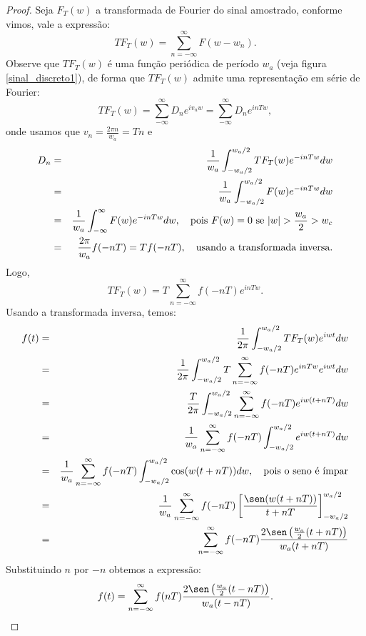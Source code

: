 \begin{proof} Seja $F_T(w)$ a transformada de Fourier do sinal amostrado, conforme vimos, vale a expressão:
\begin{equation}
TF_T(w)=\sum_{n=-\infty}^\infty F(w-w_n).
\end{equation}
Observe que $TF_T(w)$ é uma função periódica de período $w_a$ (veja figura \ref{sinal_discreto1}), de forma que $TF_T(w)$ admite uma representação em série de Fourier:
\begin{equation}
TF_T(w)=\sum_{-\infty}^\infty D_n e^{iv_n w}=\sum_{-\infty}^\infty D_n e^{in Tw},
\end{equation}
onde usamos que $v_n=\frac{2\pi n}{w_a}=Tn$ e 
\begin{eqnarray*}
D_n&=&\frac{1}{w_a}\int_{-w_a/2}^{w_a/2}TF_T(w)e^{-in Tw}dw\\
&=&\frac{1}{w_a}\int_{-w_a/2}^{w_a/2}F(w)e^{-in Tw}dw\\
&=&\frac{1}{w_a}\int_{-\infty}^{\infty}F(w)e^{-in T w}dw,\quad \hbox{pois}\ F(w)=0\ \hbox{se}\ |w|>\frac{w_a}{2}>w_c\\
&=&\frac{2\pi}{w_a}f(-nT)=Tf(-nT),\quad \hbox{usando a transformada inversa}.
\end{eqnarray*}
Logo,
\begin{equation}
TF_T(w)=T\sum_{n=-\infty}^\infty f(-nT) e^{in Tw}.
\end{equation}
Usando a transformada inversa, temos:
\begin{eqnarray*}
f(t)&=&\frac{1}{2\pi}\int_{-w_a/2}^{w_a/2}TF_T(w) e^{i w t}dw\\
&=&\frac{1}{2\pi}\int_{-w_a/2}^{w_a/2}T\sum_{n=-\infty}^\infty f(-nT) e^{in Tw} e^{i w t}dw\\
&=&\frac{T}{2\pi}\int_{-w_a/2}^{w_a/2}\sum_{n=-\infty}^\infty f(-nT) e^{iw(t+nT)} dw\\
&=&\frac{1}{w_a}\sum_{n=-\infty}^\infty f(-nT)\int_{-w_a/2}^{w_a/2}  e^{iw(t+nT)} dw\\
&=&\frac{1}{w_a}\sum_{n=-\infty}^\infty f(-nT)\int_{-w_a/2}^{w_a/2}  \cos(w(t+nT)) dw,\quad \hbox{pois o seno é ímpar}\\
&=&\frac{1}{w_a}\sum_{n=-\infty}^\infty f(-nT)\left[  \frac{\sen(w(t+nT))}{t+nT} \right]_{-w_a/2}^{w_a/2}\\
&=&\sum_{n=-\infty}^\infty f(-nT) \frac{2\sen\left(\frac{w_a}{2}(t+nT)\right)}{w_a(t+nT)} 
\end{eqnarray*}
Substituindo $n$ por $-n$ obtemos a expressão:
\begin{equation}
f(t)=\sum_{n=-\infty}^\infty f(nT) \frac{2\sen\left(\frac{w_a}{2}(t-nT)\right)}{w_a(t-nT)}.
\end{equation}
\end{proof}



